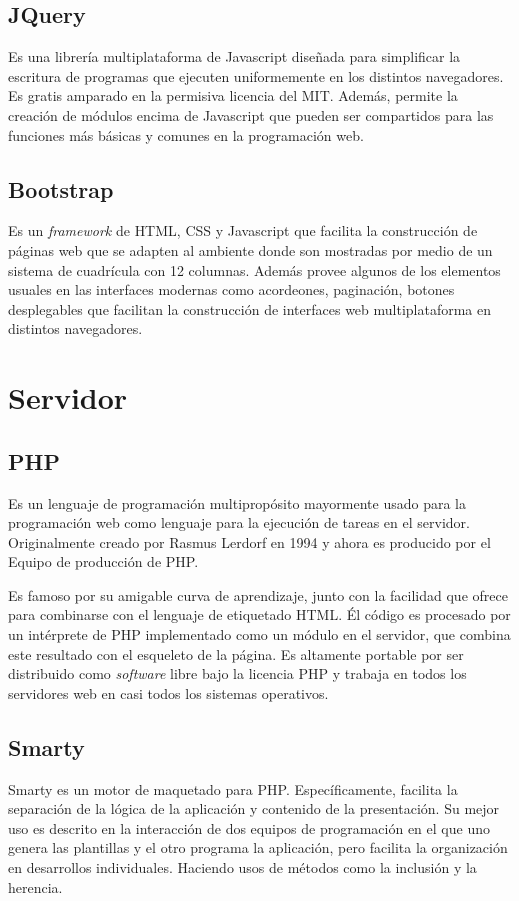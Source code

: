\subsection{JQuery}
Es una librería multiplataforma de Javascript diseñada para simplificar la escritura de programas que ejecuten uniformemente en los distintos navegadores. Es gratis amparado en la permisiva licencia del MIT. Además, permite la creación de módulos encima de Javascript que pueden ser compartidos para las funciones más básicas y comunes en la programación web\cite{bib:jquery}. 


\subsection{Bootstrap}
Es un \emph{framework} de \gls{HTML}, \gls{CSS} y Javascript que facilita la construcción de páginas web que se adapten al ambiente donde son mostradas por medio de un sistema de cuadrícula con 12 columnas. Además provee algunos de los elementos usuales en las interfaces modernas como acordeones, paginación, botones desplegables que facilitan la construcción de interfaces web multiplataforma en distintos navegadores\cite{bib:bootstrap}.


\section{Servidor}

\subsection{PHP}

Es un lenguaje de programación multipropósito mayormente usado para la programación web como lenguaje para la ejecución de tareas en el servidor. Originalmente creado por Rasmus Lerdorf en 1994 y ahora es producido por el Equipo de producción de \gls{PHP}. 

Es famoso por su amigable curva de aprendizaje, junto con la facilidad que ofrece para combinarse con el lenguaje de etiquetado \gls{HTML}. Él código es procesado por un intérprete de \gls{PHP} implementado como un módulo en el servidor, que combina este resultado con el esqueleto de la página. Es altamente portable por ser distribuido como \emph{software} libre bajo la licencia \gls{PHP} y trabaja en todos los servidores web en casi todos los sistemas operativos\cite{bib:php}. 

\subsection{Smarty}
Smarty es un motor de maquetado para \gls{PHP}. Específicamente, facilita la separación de la lógica de la aplicación y contenido de la presentación. Su mejor uso es descrito en la interacción de dos equipos de programación en el que uno genera las plantillas y el otro programa la aplicación, pero facilita la organización en desarrollos individuales. Haciendo usos de métodos como la inclusión y la herencia\cite{bib:smarty}. 

